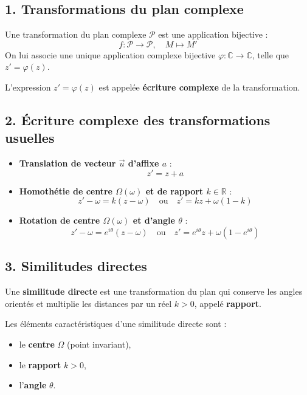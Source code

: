 
 


 \summary{}
 


\subsection*{1. Transformations du plan complexe}

Une transformation du plan complexe $\mathcal{P}$ est une application bijective :
\[
f : \mathcal{P} \longrightarrow \mathcal{P}, \quad M \longmapsto M'
\]
On lui associe une unique application complexe bijective $\varphi : \mathbb{C} \to \mathbb{C}$, telle que $z' = \varphi(z)$.

L’expression $z' = \varphi(z)$ est appelée \textbf{écriture complexe} de la transformation.

\subsection*{2. Écriture complexe des transformations usuelles}

\begin{itemize}
  \item \textbf{Translation de vecteur $\vec{u}$ d'affixe $a$} : 
  \[
  z' = z + a
  \]
  
  \item \textbf{Homothétie de centre $\Omega(\omega)$ et de rapport $k \in \mathbb{R}$} :
  \[
  z' - \omega = k(z - \omega) \quad \text{ou} \quad z' = kz + \omega(1 - k)
  \]
  
  \item \textbf{Rotation de centre $\Omega(\omega)$ et d’angle $\theta$} :
  \[
  z' - \omega = e^{i\theta}(z - \omega) \quad \text{ou} \quad z' = e^{i\theta}z + \omega(1 - e^{i\theta})
  \]
\end{itemize}

\subsection*{3. Similitudes directes}

\begin{definition}
Une \textbf{similitude directe} est une transformation du plan qui conserve les angles orientés et multiplie les distances par un réel $k > 0$, appelé \textbf{rapport}.
\end{definition}

Les éléments caractéristiques d’une similitude directe sont :
\begin{itemize}
  \item le \textbf{centre} $\Omega$ (point invariant),
  \item le \textbf{rapport} $k > 0$,
  \item l’\textbf{angle} $\theta$.
\end{itemize}

